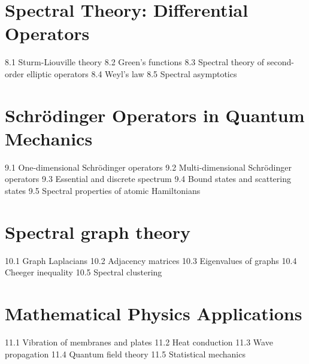 \section{Spectral Theory: Differential Operators}
8.1 Sturm-Liouville theory
8.2 Green's functions
8.3 Spectral theory of second-order elliptic operators
8.4 Weyl's law
8.5 Spectral asymptotics
\section{Schrödinger Operators in Quantum Mechanics}
9.1 One-dimensional Schrödinger operators
9.2 Multi-dimensional Schrödinger operators
9.3 Essential and discrete spectrum
9.4 Bound states and scattering states
9.5 Spectral properties of atomic Hamiltonians
\section{Spectral graph theory}
10.1 Graph Laplacians
10.2 Adjacency matrices
10.3 Eigenvalues of graphs
10.4 Cheeger inequality
10.5 Spectral clustering
\section{Mathematical Physics Applications}
11.1 Vibration of membranes and plates
11.2 Heat conduction
11.3 Wave propagation
11.4 Quantum field theory
11.5 Statistical mechanics
